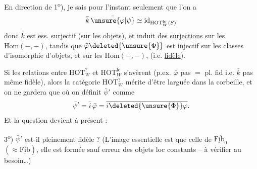 En direction de 1\textsuperscript{o}), je sais pour l'instant seulement que l'on a
\[
 \bar k\,\bar{\unsure{\varphi|\psi}}\simeq\mathrm{id}_{\mathrm{HOT}^{\mathrm{lc}}_W(S)}
\]
donc $\bar k$ est ess. surjectif (sur les  objets), et induit des \uline{surjections} sur les $\mathrm{Hom}(-,-)$, tandis que $\bar\varphi\deleted{\unsure{\Phi}}$ est injectif sur les classes d'isomorphie d'objets, et sur les $\mathrm{Hom}(-,-)$,  (i.e. \uline{fidèle}).

Si les relations entre $\mathrm{HOT}^{?}_W$ et $\mathrm{HOT}^{\mathrm{lc}}_W$ s'avèrent  (p.ex. $\bar\varphi$ pas $=$ pl. fid i.e. $\bar k$ pas même fidèle), alors la catégorie $\mathrm{HOT}^{?}_W$ mérite d'être larguée dans la corbeille, et on ne gardera que
où on définit $\bar\psi'$ comme
\[
 \bar\psi'=\bar i\,\bar\varphi=\overline{i\deleted{\unsure{\Phi}}\varphi}.
\]
Et la question  devient à présent :

3\textsuperscript{o}) $\bar\psi'$ est-il pleinement fidèle ?
(L'image essentielle est   que celle de $\overline{\underline{\mathrm{Fib}}_0}$  $(\approx\overline{\underline{\mathrm{Fib}}})$, elle est formée  sauf erreur des objets loc constants -- à vérifier au besoin\dots)

